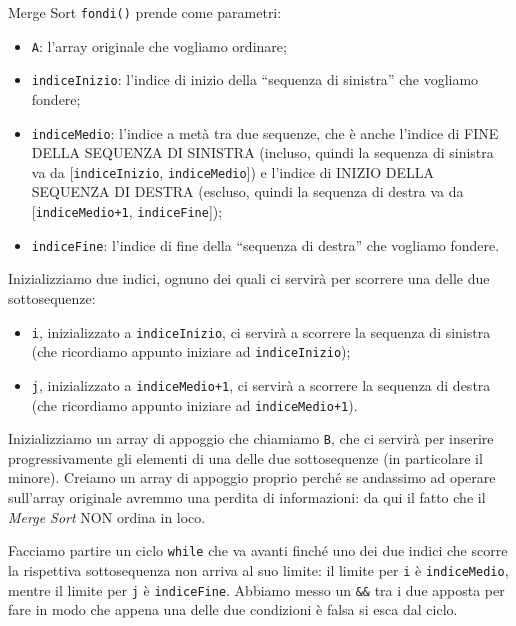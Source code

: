 \documentclass[12pt]{report}
\begin{document}
    \begin{algoritmo}{Merge Sort}{}
    	\texttt{fondi()} prende come parametri:
    	\begin{itemize}
    		\item \texttt{A}: l'array originale che vogliamo ordinare;
    		\item \texttt{indiceInizio}: l'indice di inizio della ``sequenza di sinistra'' che vogliamo fondere;
    		\item \texttt{indiceMedio}: l'indice a metà tra due sequenze, che è anche l'indice di FINE DELLA SEQUENZA DI SINISTRA (incluso, quindi la sequenza di sinistra va da [\texttt{indiceInizio}, \texttt{indiceMedio}]) e l'indice di INIZIO DELLA SEQUENZA DI DESTRA (escluso, quindi la sequenza di destra va da [\texttt{indiceMedio+1}, \texttt{indiceFine}]);
    		\item \texttt{indiceFine}: l'indice di fine della ``sequenza di destra'' che vogliamo fondere.
    	\end{itemize}
    	
    	Inizializziamo due indici, ognuno dei quali ci servirà per scorrere una delle due sottosequenze:
    	\begin{itemize}
    		\item \texttt{i}, inizializzato a \texttt{indiceInizio}, ci servirà a scorrere la sequenza di sinistra (che ricordiamo appunto iniziare ad \texttt{indiceInizio});
    		\item \texttt{j}, inizializzato a \texttt{indiceMedio+1}, ci servirà a scorrere la sequenza di destra (che ricordiamo appunto iniziare ad \texttt{indiceMedio+1}).
    	\end{itemize}
    	
    	Inizializziamo un array di appoggio che chiamiamo \texttt{B}, che ci servirà per inserire progressivamente gli elementi di una delle due sottosequenze (in particolare il minore). Creiamo un array di appoggio proprio perché se andassimo ad operare sull'array originale avremmo una perdita di informazioni: da qui il fatto che il \textit{Merge Sort} NON ordina in loco.
    	
    	Facciamo partire un ciclo \texttt{while} che va avanti finché uno dei due indici che scorre la rispettiva sottosequenza non arriva al suo limite: il limite per \texttt{i} è \texttt{indiceMedio}, mentre il limite per \texttt{j} è \texttt{indiceFine}. Abbiamo messo un \texttt{\&\&} tra i due apposta per fare in modo che appena una delle due condizioni è falsa si esca dal ciclo.
    	

\end{algoritmo}
\end{document}
